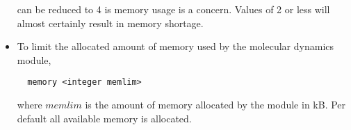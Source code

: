 \begin{itemize}
can be reduced to 4 is memory usage is a concern. Values of 2 or less
will almost certainly result in memory shortage.
\item
To limit the allocated amount of memory used by the molecular dynamics
module,
\begin{verbatim}
  memory <integer memlim>
\end{verbatim}
where $memlim$ is the amount of memory allocated by the module in
kB. Per default all available memory is allocated.
\end{itemize}





